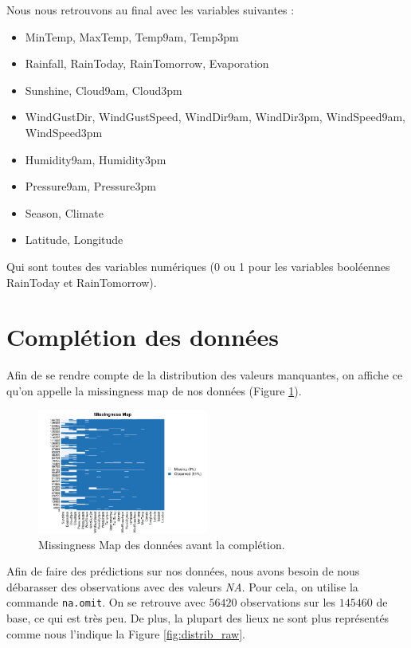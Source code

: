 \documentclass{article}
\begin{document}
Nous nous retrouvons au final avec les variables suivantes : 
\begin{itemize}
    \item MinTemp, MaxTemp, Temp9am, Temp3pm
    \item Rainfall, RainToday, RainTomorrow, Evaporation
    \item Sunshine, Cloud9am, Cloud3pm
    \item WindGustDir, WindGustSpeed, WindDir9am, WindDir3pm, WindSpeed9am, WindSpeed3pm
    \item Humidity9am, Humidity3pm
    \item Pressure9am, Pressure3pm
    \item Season, Climate
    \item Latitude, Longitude
\end{itemize}
Qui sont toutes des variables numériques (0 ou 1 pour les variables booléennes RainToday et RainTomorrow).

\section{Complétion des données}

Afin de se rendre compte de la distribution des valeurs manquantes, on affiche ce qu'on appelle la missingness map de nos données (Figure \ref{fig:missingness_raw}).

\begin{figure}[ht]
    \centering
    \includegraphics[width=0.5\textwidth]{Images/missmap.png}
    \caption{Missingness Map des données avant la complétion.}
    \label{fig:missingness_raw}
\end{figure}

Afin de faire des prédictions sur nos données, nous avons besoin de nous débarasser des observations avec des valeurs \emph{NA}. Pour cela, on utilise la commande \texttt{na.omit}. On se retrouve avec $56420$ observations sur les $145460$ de base, ce qui est très peu. De plus, la plupart des lieux ne sont plus représentés comme nous l'indique la Figure \ref{fig:distrib_raw}.
\end{document}
